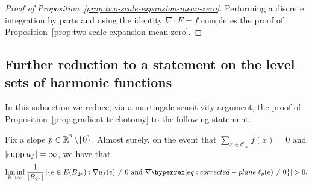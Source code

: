 \documentclass[12pt]{amsart}
\numberwithin{equation}{section}
\begin{document}
\begin{proof}[Proof of Proposition~\ref{prop:two-scale-expansion-mean-zero}]
		Performing a discrete integration by parts and using the identity $\nabla \cdot F = f$ completes the proof of Proposition~\ref{prop:two-scale-expansion-mean-zero}.
	\end{proof}
	
	
	\subsection{Further reduction to a statement on the level sets of harmonic functions}
	In this subsection we reduce, via a martingale sensitivity argument,  the proof of Proposition~\ref{prop:gradient-trichotomy} to the following statement.
	\begin{prop} \label{prop:level-set-of-harmonic-function}
		Fix a slope $p \in \operatorname{\mathbb{R}}^2 \setminus \{ 0 \}$. Almost surely, on the event that $\sum_{x \in \mathscr{C}_{\infty}} f(x) = 0$ and $|\mathrm{supp\,} u_f| = \infty$, we have that 
		\begin{equation} \label{eq:level-set-of-harmonic-function}
			\liminf_{k \to \infty}  \frac{1}{|B_{2^k}|} \left| \left\{ e \in E(B_{2^k}) : \nabla u_f(e) \neq 0 \mbox{ and }  \nabla \ellp{p}(e) \neq 0  \right\} \right|  > 0.
		\end{equation}
	\end{prop}
\end{document}
